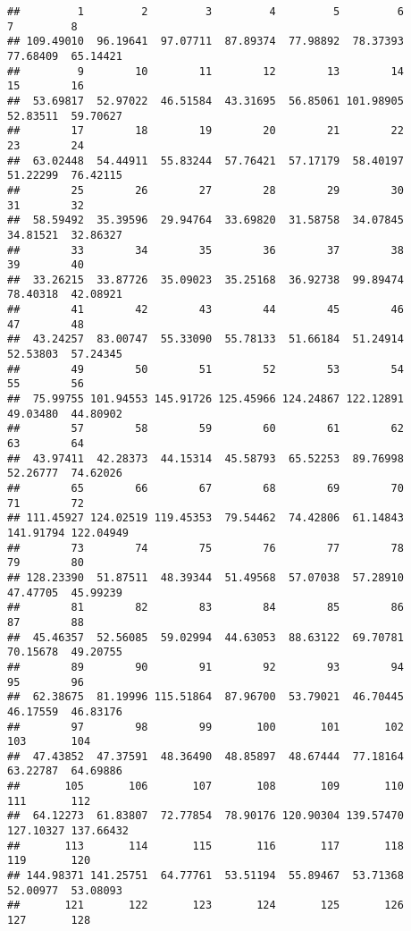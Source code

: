 \documentclass[
]{article}
\begin{document}
\begin{verbatim}
##         1         2         3         4         5         6         7         8 
## 109.49010  96.19641  97.07711  87.89374  77.98892  78.37393  77.68409  65.14421 
##         9        10        11        12        13        14        15        16 
##  53.69817  52.97022  46.51584  43.31695  56.85061 101.98905  52.83511  59.70627 
##        17        18        19        20        21        22        23        24 
##  63.02448  54.44911  55.83244  57.76421  57.17179  58.40197  51.22299  76.42115 
##        25        26        27        28        29        30        31        32 
##  58.59492  35.39596  29.94764  33.69820  31.58758  34.07845  34.81521  32.86327 
##        33        34        35        36        37        38        39        40 
##  33.26215  33.87726  35.09023  35.25168  36.92738  99.89474  78.40318  42.08921 
##        41        42        43        44        45        46        47        48 
##  43.24257  83.00747  55.33090  55.78133  51.66184  51.24914  52.53803  57.24345 
##        49        50        51        52        53        54        55        56 
##  75.99755 101.94553 145.91726 125.45966 124.24867 122.12891  49.03480  44.80902 
##        57        58        59        60        61        62        63        64 
##  43.97411  42.28373  44.15314  45.58793  65.52253  89.76998  52.26777  74.62026 
##        65        66        67        68        69        70        71        72 
## 111.45927 124.02519 119.45353  79.54462  74.42806  61.14843 141.91794 122.04949 
##        73        74        75        76        77        78        79        80 
## 128.23390  51.87511  48.39344  51.49568  57.07038  57.28910  47.47705  45.99239 
##        81        82        83        84        85        86        87        88 
##  45.46357  52.56085  59.02994  44.63053  88.63122  69.70781  70.15678  49.20755 
##        89        90        91        92        93        94        95        96 
##  62.38675  81.19996 115.51864  87.96700  53.79021  46.70445  46.17559  46.83176 
##        97        98        99       100       101       102       103       104 
##  47.43852  47.37591  48.36490  48.85897  48.67444  77.18164  63.22787  64.69886 
##       105       106       107       108       109       110       111       112 
##  64.12273  61.83807  72.77854  78.90176 120.90304 139.57470 127.10327 137.66432 
##       113       114       115       116       117       118       119       120 
## 144.98371 141.25751  64.77761  53.51194  55.89467  53.71368  52.00977  53.08093 
##       121       122       123       124       125       126       127       128 

\end{verbatim}
\end{document}
